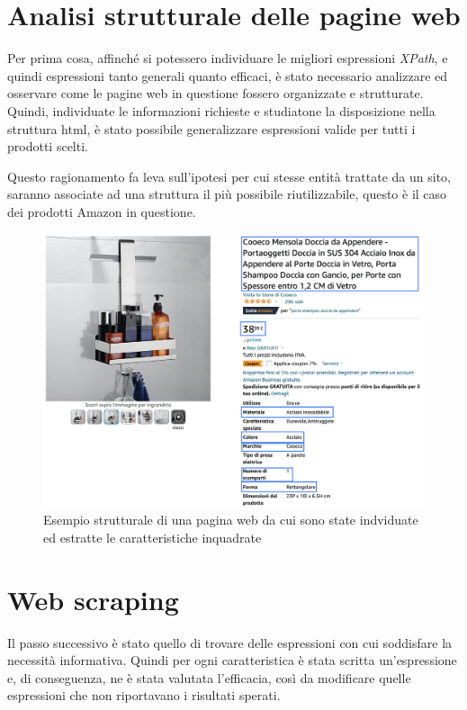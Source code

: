 \section{Analisi strutturale delle pagine web}
Per prima cosa, affinché si potessero individuare le migliori espressioni \textit{XPath}, e quindi espressioni tanto generali quanto efficaci, è stato necessario analizzare ed osservare come le pagine web in questione fossero organizzate e strutturate. Quindi, individuate le informazioni richieste e studiatone la disposizione nella struttura html, è stato possibile generalizzare espressioni valide per tutti i prodotti scelti.

Questo ragionamento fa leva sull'ipotesi per cui stesse entità trattate da un sito, saranno associate ad una struttura il più possibile riutilizzabile, questo è il caso dei prodotti Amazon in questione.

\begin{figure}[h]
    \centering
    \includegraphics[scale=0.36]{img/feature.png}
    \caption{Esempio strutturale di una pagina web da cui sono state indviduate ed estratte le caratteristiche inquadrate}
    \label{fig:features}
\end{figure}

\section{Web scraping}
Il passo successivo è stato quello di trovare delle espressioni con cui soddisfare la necessità informativa. Quindi per ogni caratteristica è stata scritta un'espressione e, di conseguenza, ne è stata valutata l'efficacia, così da modificare quelle espressioni che non riportavano i risultati sperati.

